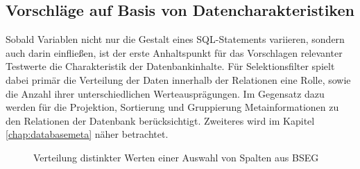 \subsection{Vorschläge auf Basis von Datencharakteristiken}\label{chap:datacharacteristics}
Sobald Variablen nicht nur die Gestalt eines SQL-Statements variieren, sondern auch darin einfließen, ist der erste Anhaltspunkt für das Vorschlagen relevanter Testwerte die Charakteristik der Datenbankinhalte.
Für Selektionsfilter spielt dabei primär die Verteilung der Daten innerhalb der Relationen eine Rolle, sowie die Anzahl ihrer unterschiedlichen Werteausprägungen.
Im Gegensatz dazu werden für die Projektion, Sortierung und Gruppierung Metainformationen zu den Relationen der Datenbank berücksichtigt.
Zweiteres wird im Kapitel \ref{chap:databasemeta} näher betrachtet.



\begin{figure}[ht]
\centering
	\caption{Verteilung distinkter Werten einer Auswahl von Spalten aus BSEG}
	\label{fig:bseg}
\end{figure}


